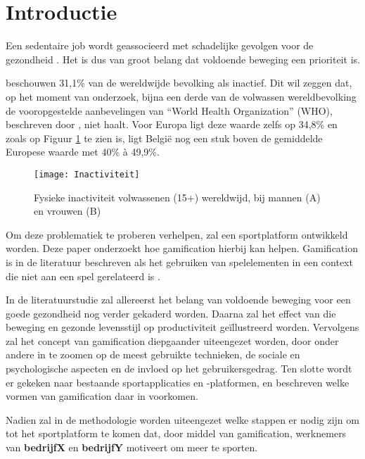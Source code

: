 
\section{Introductie}%
\label{sec:introductie}

Een sedentaire job wordt geassocieerd met schadelijke gevolgen voor de gezondheid \autocite{Buckley2015}. Het is dus van groot belang dat voldoende beweging een prioriteit is.

\textcite{Hallal2012} beschouwen 31,1\% van de wereldwijde bevolking als inactief. Dit wil zeggen dat, op het moment van onderzoek, bijna een derde van de volwassen wereldbevolking de vooropgestelde aanbevelingen van ``World Health Organization'' (WHO), beschreven door \textcite{Bull2020}, niet haalt. Voor Europa ligt deze waarde zelfs op 34,8\% en zoals op Figuur \ref{fig:inactivity} te zien is, ligt België nog een stuk boven de gemiddelde Europese waarde met 40\% à 49,9\%.

\begin{figure}[t]
    \caption{Fysieke inactiviteit volwassenen (15+) wereldwijd, bij mannen (A) en vrouwen (B) \autocite{Bull2020}}
    \texttt{[image: Inactiviteit]}
    \label{fig:inactivity}
\end{figure}

Om deze problematiek te proberen verhelpen, zal een sportplatform ontwikkeld worden. Deze paper onderzoekt hoe gamification hierbij kan helpen. Gamification is in de literatuur beschreven als het gebruiken van spelelementen in een context die niet aan een spel gerelateerd is \autocite{Gaalen2020}.

In de literatuurstudie zal allereerst het belang van voldoende beweging voor een goede gezondheid nog verder gekaderd worden. Daarna zal het effect van die beweging en gezonde levensstijl op productiviteit geïllustreerd worden. Vervolgens zal het concept van gamification diepgaander uiteengezet worden, door onder andere in te zoomen op de meest gebruikte technieken, de sociale en psychologische aspecten en de invloed op het gebruikersgedrag. Ten slotte wordt er gekeken naar bestaande sportapplicaties en -platformen, en beschreven welke vormen van gamification daar in voorkomen.

Nadien zal in de methodologie worden uiteengezet welke stappen er nodig zijn om tot het sportplatform te komen dat, door middel van gamification, werknemers van \textbf{bedrijfX} en \textbf{bedrijfY} motiveert om meer te sporten.

